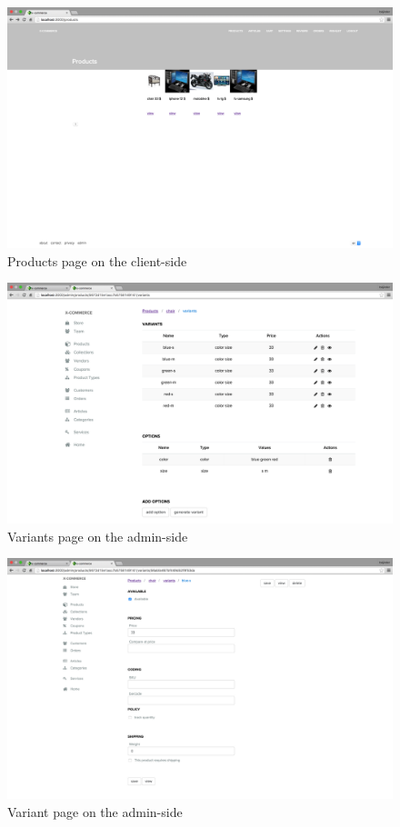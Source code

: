 \begin{figure}[htb]
\centering
\includegraphics[width=1.0\linewidth]{images/chapter4/page-products-all-cli.png}\hfill
\caption[Products page on the client-side]{Products page on the client-side}
\label{fig:page_products_client_side}
\end{figure}
\begin{figure}[htb]
\centering
\includegraphics[width=1.0\linewidth]{images/chapter4/page-variants.png}\hfill
\caption[Variants page on the admin-side]{Variants page on the admin-side}
\label{fig:page_variants_admin_side}
\end{figure}
\begin{figure}[htb]
\centering
\includegraphics[width=1.0\linewidth]{images/chapter4/page-variant.png}\hfill
\caption[Variant page on the admin-side]{Variant page on the admin-side}
\label{fig:page_variants_admin_side}
\end{figure}


